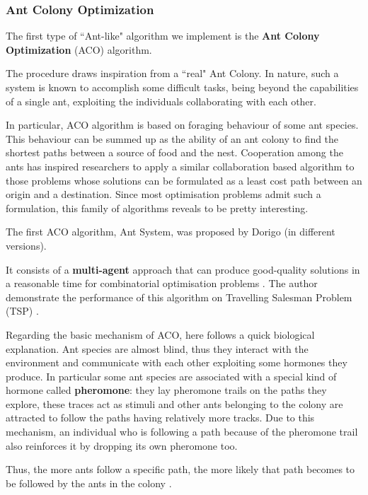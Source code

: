 \documentclass[10pt]{article}
\begin{document}
\subsubsection{Ant Colony Optimization} \label{sec:aco}
The first type of ``Ant-like" algorithm we implement is the \textbf{Ant Colony Optimization} (ACO) algorithm.

The procedure draws inspiration from a ``real"  Ant  Colony. 
In nature, such a system is  known  to  accomplish  some  difficult  tasks,  being beyond  the capabilities  of  a  single  ant,  exploiting the individuals collaborating  with  each  other.  

In particular, ACO algorithm  is based on  foraging  behaviour  of  some  ant species.  
This behaviour  can  be  summed up as the ability of an ant colony to find the shortest  paths between  a source of food  and  the nest.
Cooperation  among  the  ants  has inspired researchers to apply a similar collaboration based algorithm to those problems whose solutions can be formulated as a least cost path between an origin and a destination.
Since most optimisation problems  admit such a formulation, this family of algorithms reveals to be pretty interesting.

The first ACO algorithm, Ant System, was proposed by Dorigo \cite{cinque, sei, sette, otto, nove} (in different versions).

It consists of a \textbf{multi-agent} approach that can produce good-quality solutions in a reasonable time for combinatorial optimisation problems \cite{cinque}. 
The author demonstrate the performance of this algorithm on Travelling Salesman  Problem  (TSP) \cite{sei}. 

Regarding the basic mechanism of ACO, here follows a quick biological explanation.
Ant species are almost blind, thus they interact with the environment and communicate with each  other  exploiting some hormones they produce.  
In particular some  ant species are associated with a special kind of hormone called \textbf{pheromone}: they lay pheromone trails on the paths they explore, these traces act as stimuli and other ants belonging to the colony are attracted to follow the paths having relatively more tracks.  
Due to this mechanism, an individual who is following a  path  because of the  pheromone  trail also reinforces  it  by dropping its own pheromone too.  

Thus, the  more ants  follow  a  specific  path,  the  more  likely  that  path  becomes  to  be  followed  by  the  ants  in the colony \cite{ cinque,otto, nove}.  
\end{document}
